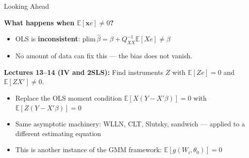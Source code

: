 \documentclass[aspectratio=169, handout, t]{beamer}
\numberwithin{equation}{section}
\begin{document}

\begin{frame}{Looking Ahead}

\textbf{What happens when $\mathbb{E}[\bm{x}e] \neq 0$?}

\pause

\begin{itemize}
    \item OLS is \textbf{inconsistent}: $\text{plim}\,\hat\beta = \beta + Q_{XX}^{-1}\mathbb{E}[Xe] \neq \beta$
    \item No amount of data can fix this --- the bias does not vanish.
\end{itemize}

\pause

\bigskip

\textbf{Lectures 13--14 (IV and 2SLS):} Find instruments $Z$ with $\mathbb{E}[Ze] = 0$ and $\mathbb{E}[ZX'] \neq 0$.
\begin{itemize}
    \item Replace the OLS moment condition $\mathbb{E}[X(Y - X'\beta)] = 0$ with $\mathbb{E}[Z(Y - X'\beta)] = 0$
    \item Same asymptotic machinery: WLLN, CLT, Slutsky, sandwich --- applied to a different estimating equation
    \item This is another instance of the GMM framework: $\mathbb{E}[g(W_i, \theta_0)] = 0$
\end{itemize}

\end{frame}
\end{document}
